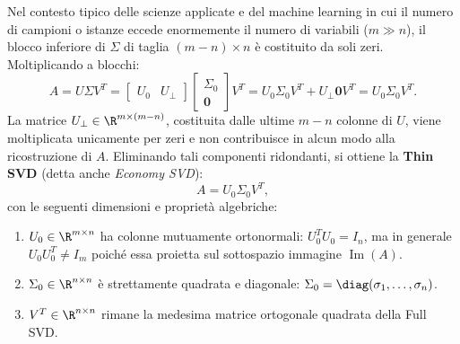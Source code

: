Nel contesto tipico delle scienze applicate e del machine learning in cui il numero di campioni o istanze eccede enormemente il numero di variabili ($m \gg n$), il blocco inferiore di $\Sigma$ di taglia $(m-n) \times n$ \`e costituito da soli zeri. Moltiplicando a blocchi:
\begin{equation}
    A = U \Sigma V^T = \begin{bmatrix} U_0 & U_{\perp} \end{bmatrix} \begin{bmatrix} \Sigma_0 \\ \mathbf{0} \end{bmatrix} V^T = U_0 \Sigma_0 V^T + U_{\perp} \mathbf{0} V^T = U_0 \Sigma_0 V^T.
\end{equation}
La matrice $U_{\perp} \in \R^{m \times (m-n)}$, costituita dalle ultime $m-n$ colonne di $U$, viene moltiplicata unicamente per zeri e non contribuisce in alcun modo alla ricostruzione di $A$.
Eliminando tali componenti ridondanti, si ottiene la \textbf{Thin SVD} (detta anche \textit{Economy SVD}):
\begin{equation}
    A = U_0 \Sigma_0 V^T,
\end{equation}
con le seguenti dimensioni e propriet\`a algebriche:
\begin{enumerate}
    \item $U_0 \in \R^{m \times n}$ ha colonne mutuamente ortonormali: $U_0^T U_0 = I_n$, ma in generale $U_0 U_0^T \neq I_m$ poich\'e essa proietta sul sottospazio immagine $\operatorname{Im}(A)$.
    \item $\Sigma_0 \in \R^{n \times n}$ \`e strettamente quadrata e diagonale: $\Sigma_0 = \diag(\sigma_1, \dots, \sigma_n)$.
    \item $V^T \in \R^{n \times n}$ rimane la medesima matrice ortogonale quadrata della Full SVD.
\end{enumerate}

